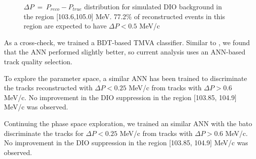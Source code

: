 \begin{figure}
  \caption{
    \label{fig:dio_delta_p_1036_1050} 
    $\Delta P ~=~ P_{reco} -P_{true}$ distribution for simulated DIO background in the region [103.6,105.0] MeV.
    77.2\% of reconstructed events in this region are expected to have $\Delta P < 0.5$ MeV/c
  }
\end{figure}

As a cross-check, we trained a BDT-based TMVA classifier. Similar to \cite{MU2E_33150_ANN_TRAINING},
we found that the ANN performed slightly better, so current analysis uses an ANN-based track
quality selection.

To explore the parameter space, a similar ANN has been trained to discriminate the tracks reconstructed
with $\Delta{P} < 0.25$ MeV/c from tracks with $\Delta{P} > 0.6$ MeV/c. No improvement in the DIO
suppression in the region [103.85, 104.9] MeV/c was observed. 

Continuing the phase space exploration, we trained an similar ANN with the bato discriminate the tracks for
$\Delta{P} < 0.25$ MeV/c from tracks with $\Delta{P} > 0.6$ MeV/c. No improvement in the DIO
suppression in the region [103.85, 104.9] MeV/c was observed. 

